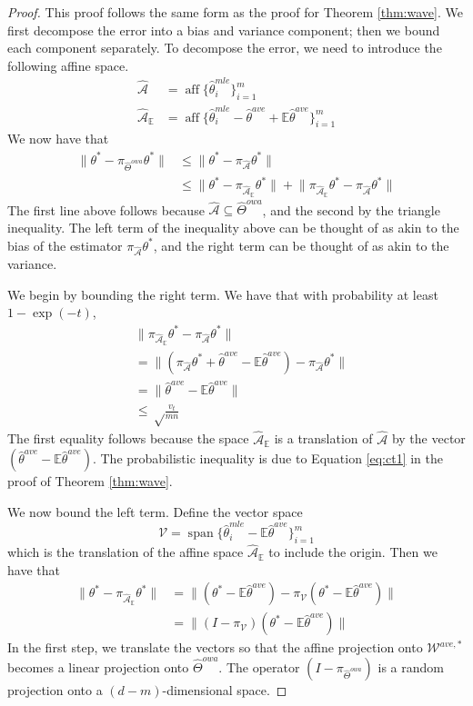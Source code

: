 \documentclass[twoside]{article}
\DeclareMathOperator*{\vecspan}{span}
\DeclareMathOperator*{\affspan}{aff}
\newcommand{\W}{{\hat \Theta^{\textit{owa}}}}
\newcommand{\Waff}{\mathcal{\hat A}}
\newcommand{\WaffE}{{\mathcal{\hat A}_\E}}
\newcommand{\Wave}{{\mathcal{\hat W}^{ave}}}
\newcommand{\Wtave}{{\mathcal{W}^{ave,*}}}
\newcommand{\V}{\mathcal{V}}
\newcommand{\E}{\mathbb{E}}
\newcommand{\w}{\theta}
\newcommand{\wave}{\hat\w^{ave}}
\newcommand{\wtave}{\E\hat\w^{ave}}
\newcommand{\wmle}{\hat\w^{mle}}
\newcommand{\wstar}{{\w^{*}}}
\newcommand{\ltwo}[1]{{\lVert {#1} \rVert}}
\newcommand{\proj}[1]{\pi_{{#1}}}
\begin{document}
\begin{proof}
This proof follows the same form as the proof for Theorem \ref{thm:wave}.
We first decompose the error into a bias and variance component;
then we bound each component separately.
To decompose the error, we need to introduce the following affine space.
\begin{align}
\Waff&=\affspan \{\wmle_i\}_{i=1}^m
\\
\WaffE&=\affspan \{\wmle_i - \wave + \E\wave\}_{i=1}^m
\end{align}
We now have that
\begin{align}
\ltwo{\wstar-\proj\W\wstar}
&\le
\ltwo{\wstar-\proj\Waff\wstar}
\\
&\le
\ltwo{\wstar-\proj\WaffE\wstar}
+
\ltwo{\proj\WaffE\wstar-\proj\Waff\wstar}
\end{align}
The first line above follows because $\Waff\subseteq\W$,
and the second by the triangle inequality.
The left term of the inequality above can be thought of as akin to the bias of the estimator $\proj\Waff\wstar$,
and the right term can be thought of as akin to the variance.

We begin by bounding the right term.
We have that with probability at least $1-\exp(-t)$,
\begin{align}
&\ltwo{\proj\WaffE\wstar-\proj\Waff\wstar}
\\
&=
\ltwo{(\proj\Waff\wstar+\wave-\wtave)-\proj\Waff\wstar}
\\&=
\ltwo{\wave-\wtave}
\\&\le
\sqrt\frac{v_t}{mn}
\end{align}
The first equality follows because the space $\WaffE$ is a translation of $\Waff$ by the vector $(\wave-\wtave)$.
The probabilistic inequality is due to Equation \ref{eq:ct1} in the proof of Theorem \ref{thm:wave}.

We now bound the left term.
Define the vector space
\begin{equation}
\V=\vecspan \{\wmle_i - \wtave\}_{i=1}^m
\end{equation}
which is the translation of the affine space $\WaffE$ to include the origin.
Then we have that
\begin{align}
\ltwo{\wstar-\proj\WaffE\wstar}
&=
\ltwo{(\wstar-\wtave)-\proj\V(\wstar-\wtave)}
\\&=
\ltwo{(I-\proj\V)(\wstar-\wtave)}
\end{align}
In the first step, we translate the vectors so that the affine projection onto $\Wtave$ becomes a linear projection onto $\W$.
The operator $(I-\proj\W)$ is a random projection onto a $(d-m)$-dimensional space.


\end{proof}
\end{document}
